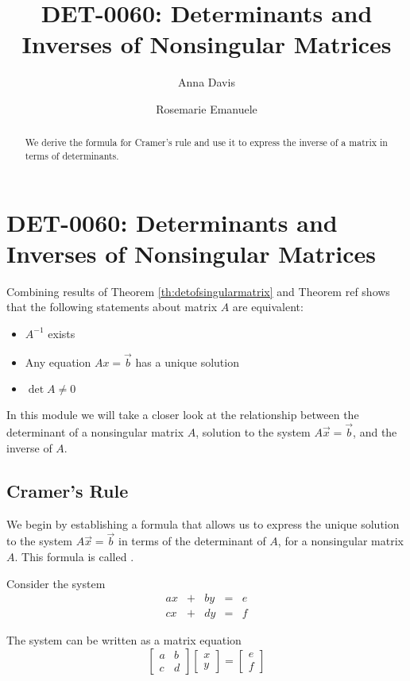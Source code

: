 \documentclass{ximera}
\author{Anna Davis \and Rosemarie Emanuele} \title{DET-0060: Determinants and Inverses of Nonsingular Matrices} \license{CC-BY 4.0}
\begin{document}
\begin{abstract}
 We derive the formula for Cramer's rule and use it to express the inverse of a matrix in terms of determinants.
\end{abstract}
\maketitle

\section*{DET-0060: Determinants and Inverses of Nonsingular Matrices}

Combining results of Theorem \ref{th:detofsingularmatrix} and Theorem {\color{red}ref} shows that the following statements about matrix $A$ are equivalent:
\begin{itemize}
\item $A^{-1}$ exists
\item Any equation $Ax=\vec{b}$ has a unique solution
\item $\det{A}\neq 0$
\end{itemize}
In this module we will take a closer look at the relationship between the determinant of a nonsingular matrix $A$, solution to the system $A\vec{x}=\vec{b}$, and the inverse of $A$.  
\subsection*{Cramer's Rule}
We begin by establishing a formula that allows us to express the unique solution to the system $A\vec{x}=\vec{b}$ in terms of the determinant of $A$, for a nonsingular matrix $A$.  This formula is called .

Consider the system
$$\begin{array}{ccccc}
      ax& +&by&=&e\\
      cx & +&dy&= &f 
    \end{array}$$
    
 The system can be written as a matrix equation
 $$\begin{bmatrix}a&b\\c&d\end{bmatrix}\begin{bmatrix}x\\y\end{bmatrix}=\begin{bmatrix}e\\f\end{bmatrix}$$
 
\end{document}

